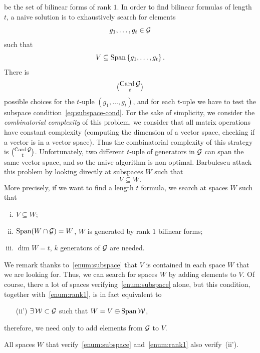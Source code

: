 be the set of bilinear forms of rank $1$. In order to find bilinear formulas of
length $t$, a naive solution is to exhaustively search for elements 
\[
  g_1, \dots, g_t\in\mathcal{G}
\]
such that
\begin{equation}
  V\subseteq\operatorname{Span}\left\{ g_1, \dots, g_t \right\}.
  \label{eq:subspace-cond}
\end{equation}
There is 
\[
  {\operatorname{Card}\mathcal{G}}\choose{t}
\]
possible choices for the $t$-uple $(g_1, \dots, g_t)$, and for each $t$-uple we
have to test the subspace condition~\eqref{eq:subspace-cond}. For the sake of
simplicity, we consider the \emph{combinatorial complexity} of this problem, \ie
we consider that all matrix operations have constant complexity (\eg computing
the dimension of a vector space, checking if a vector is in a vector space).
Thus the combinatorial complexity of this strategy is ${\operatorname{Card}\mathcal{G}}\choose{t}$.
Unfortunately, two different $t$-uple of generators in $\mathcal{G}$ can span the same
vector space, and so the naive algorithm is non optimal. Barbulescu \etal attack
this problem by looking directly at subspaces $W$ such that
\[
V\subseteq W.
\]
More precisely, if we want to find a length $t$ formula, we search at spaces $W$ such that
\begin{enumerate}[(i)]
  \item \label{enum:subspace} $V\subseteq W$;
  \item \label{enum:rank1} $\operatorname{Span}(W\cap\mathcal{G}) = W$, \ie $W$ is generated by rank $1$ bilinear forms;
  \item $\dim W = t$, \ie $k$ generators of $\mathcal{G}$ are needed.
\end{enumerate}
We remark thanks to~\ref{enum:subspace} that $V$ is contained in each space $W$
that we are looking for. Thus, we can search for spaces $W$ by adding elements
to $V$. Of course, there a lot of spaces verifying~\ref{enum:subspace}
alone, but this condition, together with~\ref{enum:rank1}, is in fact equivalent
to
\begin{enumerate}
  \item[(ii')] \label{enum:sum} $\exists\,\mathcal{W}\subset\mathcal{G}$ such that
    $W=V\oplus\operatorname{Span}\mathcal{W}$,
\end{enumerate}
therefore, we need only to add elements from $\mathcal{G}$ to $V$.
\begin{lm}
  \label{lm:cond-equiv}
  All spaces $W$ that verify~\ref{enum:subspace} and~\ref{enum:rank1} also
  verify~(ii').
\end{lm}
